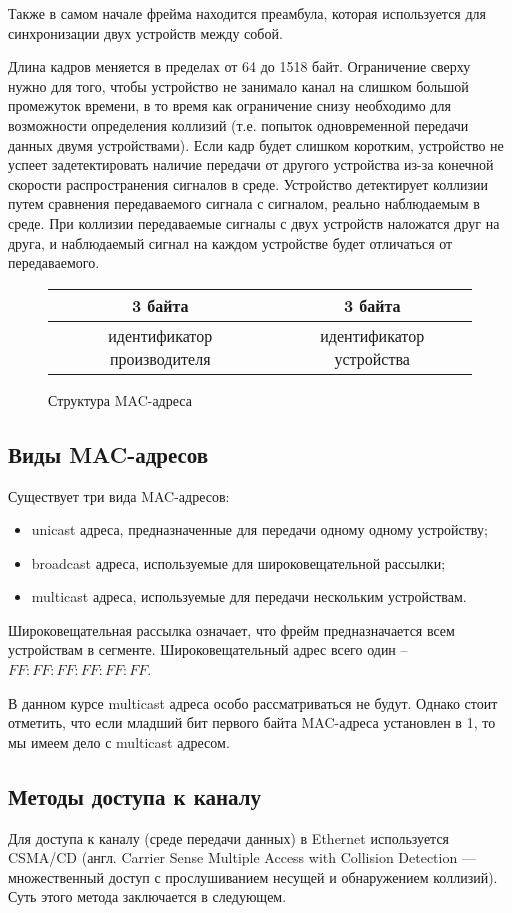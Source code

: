 Также в самом начале фрейма находится преамбула, которая используется для синхронизации двух устройств между собой.

Длина кадров меняется в пределах от 64 до 1518 байт. Ограничение сверху нужно для того, чтобы устройство не занимало канал на слишком большой промежуток времени, в то время как ограничение снизу необходимо для возможности определения коллизий (т.е. попыток одновременной передачи данных двумя устройствами). Если кадр будет слишком коротким, устройство не успеет задетектировать наличие передачи от другого устройства из-за конечной скорости распространения сигналов в среде. Устройство детектирует коллизии путем сравнения передаваемого сигнала с сигналом, реально наблюдаемым в среде. При коллизии передаваемые сигналы с двух устройств наложатся друг на друга, и наблюдаемый сигнал на каждом устройстве будет отличаться от передаваемого.
\begin{figure}[t!]
	\centering
	\begin{tabular}{cc}
		\hline
		\multicolumn{1}{|c|}{3 байта} & \multicolumn{1}{c|}{3 байта} \\ \hline
		идентификатор производителя & идентификатор устройства
	\end{tabular}
	\caption{Структура MAC-адреса}
	\label{fig:mac_address_structure}
\end{figure}
\subsection{Виды MAC-адресов}
Существует три вида MAC-адресов:
\begin{itemize}
	\item unicast адреса, предназначенные для передачи одному одному устройству;
	\item broadcast адреса, используемые для широковещательной рассылки;
	\item multicast адреса, используемые для передачи нескольким устройствам.
\end{itemize}

Широковещательная рассылка означает, что фрейм предназначается всем устройствам в сегменте. Широковещательный адрес всего один -- $FF:FF:FF:FF:FF:FF$. 

В данном курсе multicast адреса особо рассматриваться не будут. Однако стоит отметить, что если младший бит первого байта MAC-адреса установлен в 1, то мы имеем дело с multicast адресом. 
\subsection{Методы доступа к каналу}
Для доступа к каналу (среде передачи данных) в Ethernet используется CSMA/CD (англ. Carrier Sense Multiple Access with Collision Detection — множественный доступ с прослушиванием несущей и обнаружением коллизий). Суть этого метода заключается в следующем.

